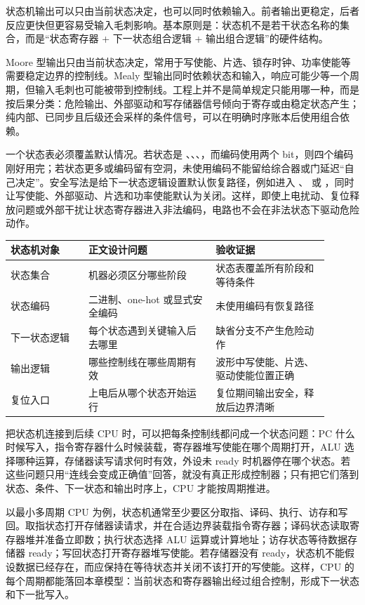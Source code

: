 状态机输出可以只由当前状态决定，也可以同时依赖输入。前者输出更稳定，后者反应更快但更容易受输入毛刺影响。基本原则是：状态机不是若干状态名称的集合，而是“状态寄存器 + 下一状态组合逻辑 + 输出组合逻辑”的硬件结构。

Moore 型输出只由当前状态决定，常用于写使能、片选、锁存时钟、功率使能等需要稳定边界的控制线。Mealy 型输出同时依赖状态和输入，响应可能少等一个周期，但输入毛刺也可能被带到控制线。工程上并不是简单规定只能用哪一种，而是按后果分类：危险输出、外部驱动和写存储器信号倾向于寄存或由稳定状态产生；纯内部、已同步且后级还会采样的条件信号，可以在明确时序账本后使用组合依赖。

一个状态表必须覆盖默认情况。若状态是 、、、，而编码使用两个 bit，则四个编码刚好用完；若状态更多或编码留有空洞，未使用编码不能留给综合器或门延迟“自己决定”。安全写法是给下一状态逻辑设置默认恢复路径，例如进入 、 或 ，同时让写使能、外部驱动、片选和功率使能默认为关闭。这样，即使上电扰动、复位释放问题或外部干扰让状态寄存器进入非法编码，电路也不会在非法状态下驱动危险动作。

\begin{longtable}{L{0.22\linewidth}L{0.36\linewidth}L{0.32\linewidth}}
\toprule
状态机对象 & 正文设计问题 & 验收证据 \\
\midrule
状态集合 & 机器必须区分哪些阶段 & 状态表覆盖所有阶段和等待条件 \\
状态编码 & 二进制、one-hot 或显式安全编码 & 未使用编码有恢复路径 \\
下一状态逻辑 & 每个状态遇到关键输入后去哪里 & 缺省分支不产生危险动作 \\
输出逻辑 & 哪些控制线在哪些周期有效 & 波形中写使能、片选、驱动使能位置正确 \\
复位入口 & 上电后从哪个状态开始运行 & 复位期间输出安全，释放后边界清晰 \\
\bottomrule
\end{longtable}

把状态机连接到后续 CPU 时，可以把每条控制线都问成一个状态问题：PC 什么时候写入，指令寄存器什么时候装载，寄存器堆写使能在哪个周期打开，ALU 选择哪种运算，存储器读写请求何时有效，外设未 ready 时机器停在哪个状态。若这些问题只用“连线会变成正确值”回答，就没有真正形成控制器；只有把它们落到状态、条件、下一状态和输出时序上，CPU 才能按周期推进。

以最小多周期 CPU 为例，状态机通常至少要区分取指、译码、执行、访存和写回。取指状态打开存储器读请求，并在合适边界装载指令寄存器；译码状态读取寄存器堆并准备立即数；执行状态选择 ALU 运算或计算地址；访存状态等待数据存储器 ready；写回状态打开寄存器堆写使能。若存储器没有 ready，状态机不能假设数据已经存在，而应保持在等待状态并关闭不该打开的写使能。这样，CPU 的每个周期都能落回本章模型：当前状态和寄存器输出经过组合控制，形成下一状态和下一批写入。

